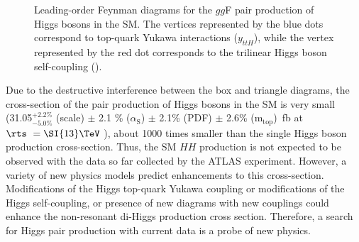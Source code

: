 \begin{figure}[!h]
        \caption{Leading-order Feynman diagrams for the $gg$F pair production of Higgs bosons in the SM. The vertices represented by the blue dots correspond to top-quark Yukawa interactions ($y_{ttH}$), while the vertex represented by the red dot corresponds to the trilinear Higgs boson self-coupling (\hhh).}
        \label{fig:HHProductionFeynmanDiagrams}
    \end{figure}

Due to the destructive interference between the box and triangle diagrams, the cross-section of the pair production of Higgs bosons in the SM is very small (31.05$^{+2.2\%}_{-5.0\%}$ (scale) $\pm$ 2.1 \% ($\alpha_{\mathrm{S}}$) $\pm$ 2.1\% (PDF) $\pm$ 2.6\% (m$_{\mathrm{top}}$)~fb at $\rts~= \SI{13} \TeV$ \cite{Grazzini:2018bsd}), about 1000 times smaller than the single Higgs boson production cross-section. Thus, the SM $HH$ production is not expected to be observed with the data so far collected by the ATLAS experiment.  However, a variety of new physics models predict enhancements to this cross-section. Modifications of the Higgs top-quark Yukawa coupling or modifications of the Higgs self-coupling, or presence of new diagrams with new couplings could enhance the non-resonant di-Higgs production cross section. Therefore, a search for Higgs pair production with current data is a probe of new physics. 

